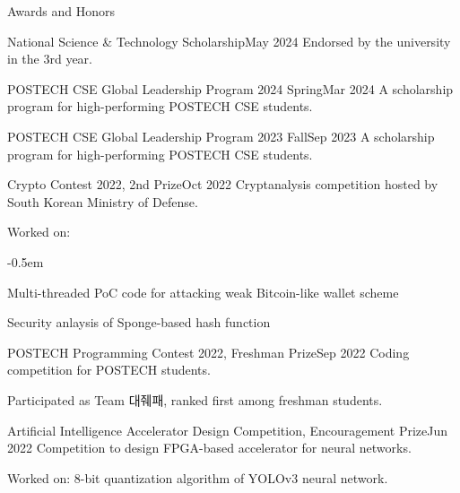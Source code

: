 \documentclass{resume}
\begin{document}
\begin{res-section}{Awards and Honors}
  \begin{res-subsection}{National Science \& Technology Scholarship}{May 2024}
    Endorsed by the university in the 3rd year.
  \end{res-subsection}

  \begin{res-subsection}{POSTECH CSE Global Leadership Program 2024 Spring}{Mar 2024}
    A scholarship program for high-performing POSTECH CSE students.
  \end{res-subsection}

  \begin{res-subsection}{POSTECH CSE Global Leadership Program 2023 Fall}{Sep 2023}
    A scholarship program for high-performing POSTECH CSE students.
  \end{res-subsection}

  \begin{res-subsection}{Crypto Contest 2022, 2nd Prize}{Oct 2022}
    Cryptanalysis competition hosted by South Korean Ministry of Defense.

    \item Worked on:
    \vspace{-0.5em}
    \begin{list}{--}{}
      \itemsep -0.5em
      \item Multi-threaded PoC code for attacking weak Bitcoin-like wallet scheme
      \item Security anlaysis of Sponge-based hash function
    \end{list}
  \end{res-subsection}

  \begin{res-subsection}{POSTECH Programming Contest 2022, Freshman Prize}{Sep 2022}
    Coding competition for POSTECH students.

    \item Participated as Team 대줴패, ranked first among freshman students.
  \end{res-subsection}

  \begin{res-subsection}{Artificial Intelligence Accelerator Design Competition, Encouragement Prize}{Jun 2022}
    Competition to design FPGA-based accelerator for neural networks.

    \item Worked on: 8-bit quantization algorithm of YOLOv3 neural network.
  \end{res-subsection}
\end{res-section}
\end{document}
